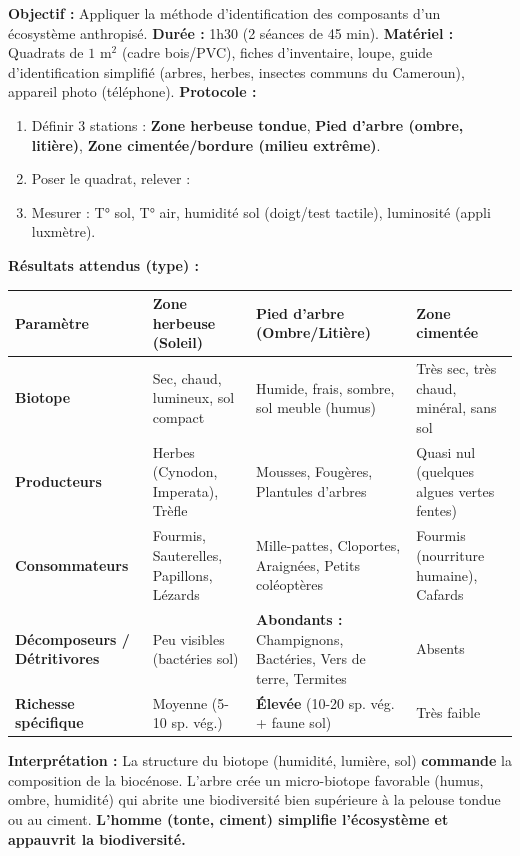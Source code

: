 \documentclass[11pt]{article}
\begin{document}
\begin{experience}
\textbf{Objectif :} Appliquer la méthode d'identification des composants d'un écosystème anthropisé.
\textbf{Durée :} 1h30 (2 séances de 45 min).
\textbf{Matériel :} Quadrats de $1 \text{ m}^2$ (cadre bois/PVC), fiches d'inventaire, loupe, guide d'identification simplifié (arbres, herbes, insectes communs du Cameroun), appareil photo (téléphone).
\textbf{Protocole :}
\begin{enumerate}
    \item Définir 3 stations : \textbf{Zone herbeuse tondue}, \textbf{Pied d'arbre (ombre, litière)}, \textbf{Zone cimentée/bordure (milieu extrême)}.
    \item Poser le quadrat, relever : %
    \item Mesurer : T° sol, T° air, humidité sol (doigt/test tactile), luminosité (appli luxmètre).
\end{enumerate}
\textbf{Résultats attendus (type) :}
\begin{center}
\begin{tabularx}{\linewidth}{|l|X|X|X|}\hline
\textbf{Paramètre} & \textbf{Zone herbeuse (Soleil)} & \textbf{Pied d'arbre (Ombre/Litière)} & \textbf{Zone cimentée} \\ \hline
\textbf{Biotope} & Sec, chaud, lumineux, sol compact & Humide, frais, sombre, sol meuble (humus) & Très sec, très chaud, minéral, sans sol \\ \hline
\textbf{Producteurs} & Herbes (Cynodon, Imperata), Trèfle & Mousses, Fougères, Plantules d'arbres & Quasi nul (quelques algues vertes fentes) \\ \hline
\textbf{Consommateurs} & Fourmis, Sauterelles, Papillons, Lézards & Mille-pattes, Cloportes, Araignées, Petits coléoptères & Fourmis (nourriture humaine), Cafards \\ \hline
\textbf{Décomposeurs / Détritivores} & Peu visibles (bactéries sol) & \textbf{Abondants :} Champignons, Bactéries, Vers de terre, Termites & Absents \\ \hline
\textbf{Richesse spécifique} & Moyenne (5-10 sp. vég.) & \textbf{Élevée} (10-20 sp. vég. + faune sol) & Très faible \\ \hline
\end{tabularx}
\end{center}
\textbf{Interprétation :} La structure du biotope (humidité, lumière, sol) \textbf{commande} la composition de la biocénose. L'arbre crée un micro-biotope favorable (humus, ombre, humidité) qui abrite une biodiversité bien supérieure à la pelouse tondue ou au ciment. \textbf{L'homme (tonte, ciment) simplifie l'écosystème et appauvrit la biodiversité.}
\end{experience}
\end{document}
